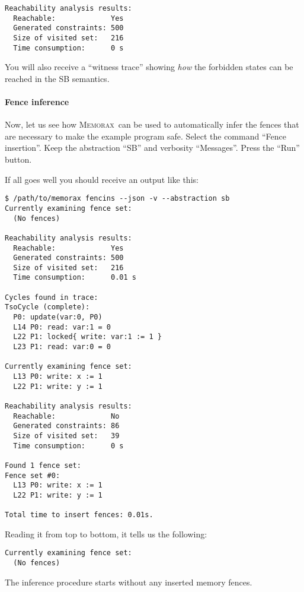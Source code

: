 \documentclass[a4paper]{article}
\newcommand{\memorax}{\textsc{Memorax}}
\begin{document}
\noindent
\begin{verbatim}
Reachability analysis results:
  Reachable:             Yes
  Generated constraints: 500
  Size of visited set:   216
  Time consumption:      0 s
\end{verbatim}

You will also receive a ``witness trace'' showing \emph{how} the
forbidden states can be reached in the SB semantics.

\paragraph{Fence inference}
Now, let us see how \memorax\ can be used to automatically infer the
fences that are necessary to make the example program safe. Select the
command ``Fence insertion''. Keep the abstraction ``SB'' and verbosity
``Messages''. Press the ``Run'' button.

If all goes well you should receive an output like this:

\noindent
\begin{verbatim}
$ /path/to/memorax fencins --json -v --abstraction sb
Currently examining fence set:
  (No fences)

Reachability analysis results:
  Reachable:             Yes
  Generated constraints: 500
  Size of visited set:   216
  Time consumption:      0.01 s

Cycles found in trace:
TsoCycle (complete):
  P0: update(var:0, P0)
  L14 P0: read: var:1 = 0
  L22 P1: locked{ write: var:1 := 1 }
  L23 P1: read: var:0 = 0

Currently examining fence set:
  L13 P0: write: x := 1
  L22 P1: write: y := 1

Reachability analysis results:
  Reachable:             No
  Generated constraints: 86
  Size of visited set:   39
  Time consumption:      0 s

Found 1 fence set:
Fence set #0:
  L13 P0: write: x := 1
  L22 P1: write: y := 1

Total time to insert fences: 0.01s.
\end{verbatim}

Reading it from top to bottom, it tells us the following:

\noindent
\begin{verbatim}
Currently examining fence set:
  (No fences)
\end{verbatim}

The inference procedure starts without any inserted memory fences.
\end{document}
